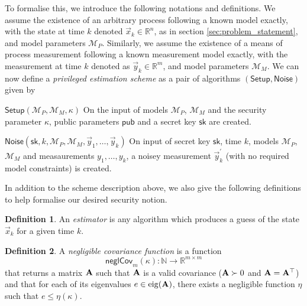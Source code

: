 \documentclass[conference]{IEEEtran}
\theoremstyle{definition}
\newtheorem{definition}{Definition}[section]
\theoremstyle{definition}
\theoremstyle{remark}
\begin{document}
To formalise this, we introduce the following notations and definitions. We assume the existence of an arbitrary process following a known model exactly, with the state at time $k$ denoted $\vec{x}_k\in\mathbb{R}^n$, as in section \ref{sec:problem_statement}, and model parameters $\mathcal{M}_P$. Similarly, we assume the existence of a means of process measurement following a known measurement model exactly, with the measurement at time $k$ denoted as $\vec{y}_k\in\mathbb{R}^m$, and model parameters $\mathcal{M}_M$. We can now define a \textit{privileged estimation scheme} as a pair of algorithms $(\mathsf{Setup},\mathsf{Noise})$ given by
\begin{LaTeXdescription}
   \item[$\mathsf{Setup}(\mathcal{M}_P, \mathcal{M}_M, \kappa)$] On the input of models $\mathcal{M}_P$, $\mathcal{M}_M$ and the security parameter $\kappa$, public parameters $\mathsf{pub}$ and a secret key $\mathsf{sk}$ are created.
   \item[$\mathsf{Noise}(\mathsf{sk}, k, \mathcal{M}_P, \mathcal{M}_M, \vec{y}_1, \dots, \vec{y}_k)$] On input of secret key $\mathsf{sk}$, time $k$, models $\mathcal{M}_P$, $\mathcal{M}_M$ and measaurements $y_1,\dots,y_k$, a noisey measurement $\vec{y}^\prime_k$ (with no required model constraints) is created.
\end{LaTeXdescription}
In addition to the scheme description above, we also give the following definitions to help formalise our desired security notion.
\begin{definition}\label{def:estimator}
   An \textit{estimator} is any algorithm which produces a guess of the state $\vec{x}_k$ for a given time $k$.
\end{definition}
\begin{definition}
   A \textit{negligible covariance function} is a function 
   \begin{equation}
      \mathsf{neglCov}_m(\kappa):\mathbb{N}\rightarrow \mathbb{R}^{m\times m}
   \end{equation}
   that returns a matrix ${{\mathbf{A}}}$ such that ${{\mathbf{A}}}$ is a valid covariance (${{\mathbf{A}}}\succ 0$ and ${{\mathbf{A}}}={{\mathbf{A}}}^\top$) and that for each of its eigenvalues $e\in\operatorfont{eig}(\mat{A})$, there exists a negligible function $\eta$ such that $e\leq\eta(\kappa)$.
\end{definition}
\end{document}
